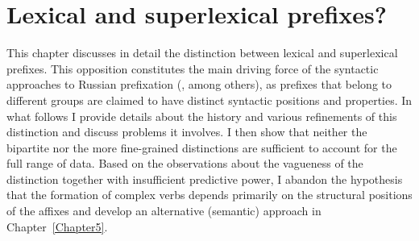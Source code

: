 
\chapter{Lexical and superlexical prefixes?} 
\label{Chapter4}

This chapter discusses in detail the distinction between lexical and superlexical prefixes. This opposition constitutes the main driving force of the syntactic approaches to Russian prefixation (\citealt{Ramchand:04, Svenonius:04b, Romanova:06}, among others), as prefixes that belong to different groups are claimed to have distinct syntactic positions and properties. In what follows I provide details about the history and various refinements of this distinction and discuss problems it involves. I then show that neither the bipartite nor the more fine-grained distinctions are sufficient to account for the full range of data. Based on the observations about the vagueness of the distinction together with insufficient predictive power, I abandon the hypothesis that the formation of complex verbs depends primarily on the structural positions of the affixes and develop an alternative (semantic) approach in Chapter~\ref{Chapter5}.

